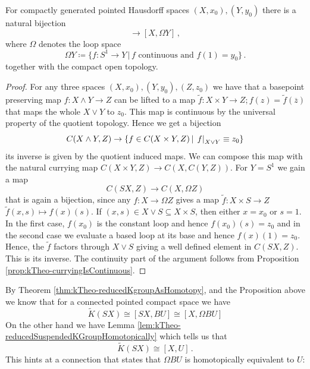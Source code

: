 \begin{proposition}
	For compactly generated pointed Hausdorff spaces $(X,x_0),(Y,y_0)$ there is a natural bijection
	\begin{equation*}
		[SX,Y]\to [X,\Omega Y]\,,
	\end{equation*} where $\Omega$ denotes the loop space
	\begin{equation*}
		\Omega Y \coloneq\{f:S^1\to Y\,| \, f \text{ continuous and }f(1)=y_0\}\,.
	\end{equation*} together with the compact open topology.
\end{proposition}
\begin{proof}
 For any three spaces $(X,x_0),(Y,y_0),(Z,z_0)$ we have that a basepoint preserving map
 $f:X\wedge Y\to Z$ can be lifted to a map $\tilde{f}:X \times Y \to Z;f(z)=\tilde{f}(\overline{z})$ that maps the whole $X\vee Y$ to $z_0$. This map is continuous by the universal property of the quotient topology. Hence we get a bijection
 \begin{equation*}
	C(X\wedge Y,Z)\to \{f\in C(X\times Y,Z)\,|\, \left.f\right|_{X\vee Y} \equiv z_0\}
 \end{equation*} its inverse is given by the quotient induced maps. 
 We can compose this map with the natural currying map $C(X\times Y,Z)\to C(X,C(Y,Z))$. For $Y=S^1$ we gain a map 
 \begin{equation*}
	C(SX,Z)\to C(X,\Omega Z)
 \end{equation*} that is again a bijection, since any $f:X\to \Omega Z$ gives a map $\tilde{f}:X\times S\to Z$ $\tilde{f}(x,s)\mapsto f(x)(s)$. If $(x,s)\in X\vee S\subseteq X\times S$, then either $x=x_0$ or $s=1$. In the first case, $f(x_0)$ is the constant loop and hence $f(x_0)(s)=z_0$ and in the second case we evaluate a based loop at its base and hence $f(x)(1)=z_0$. Hence, the $\tilde{f}$ factors through $X\vee S$ giving a well defined element in $C(SX,Z)$. This is its inverse. The continuity part of the argument follows from Proposition \ref{prop:kTheo-curryingIsContinuous}.
\end{proof}
\begin{remark}
	By Theorem \ref{thm:kTheo-reducedKgroupAsHomotopy}, and the Proposition above we know that for a connected pointed compact space we have
	\begin{equation*}
		\tilde{K}(SX)\cong[SX,BU] \cong [X,\Omega B U]
	\end{equation*} On the other hand we have Lemma \ref{lem:kTheo-reducedSuspendedKGroupHomotopically} which tells us that 
	\begin{equation*}
		\tilde{K}(SX) \cong [X,U]\,.
	\end{equation*}This hints at a connection that states that 
$\Omega B U$ is homotopically equivalent to $ U$:
\end{remark}
 


